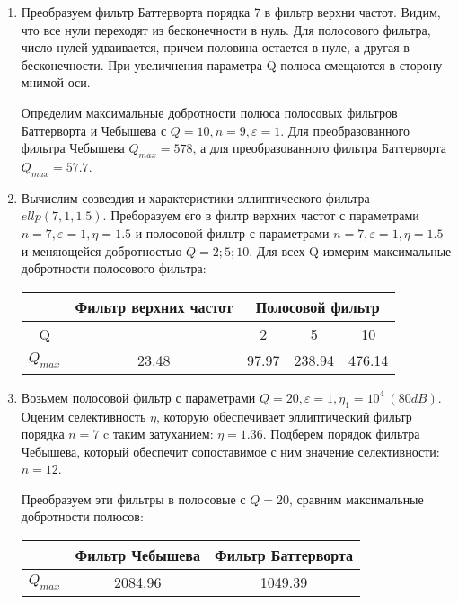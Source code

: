 \documentclass[a4paper, 12pt]{article}%
\begin{document}
\begin{enumerate}
\item Преобразуем фильтр Баттерворта порядка 7 в фильтр верхни частот. Видим, что все нули переходят из бесконечности в нуль. Для полосового фильтра, число нулей удваивается, причем половина остается в нуле, а другая в бесконечности. При увеличнения параметра Q полюса смещаются в сторону мнимой оси.

Определим максимальные добротности полюса полосовых фильтров Баттерворта и Чебышева с $Q = 10, n = 9, \varepsilon = 1$. Для преобразованного фильтра Чебышева $Q_{max} = 578$, а для преобразованного фильтра Баттерворта $Q_{max} = 57.7$.

\item Вычислим созвездия и характеристики эллиптического фильтра $ellp(7, 1, 1.5)$. Преборазуем его в филтр верхних частот с параметрами $n = 7, \varepsilon = 1, \eta = 1.5$ и полосовой фильтр с параметрами $n = 7, \varepsilon = 1, \eta = 1.5$ и меняющейся добротностью $Q = 2;5;10$. Для всех Q измерим максимальные добротности полосового фильтра:

\begin{center}
\begin{tabular}{|c|c|c|c|c|}
\hline 
 & Фильтр верхних частот & \multicolumn{3}{c|}{Полосовой фильтр} \\ 
\hline 
Q &  & 2 & 5 & 10 \\ 
\hline 
$Q_{max}$ & 23.48 & 97.97 & 238.94 & 476.14 \\ 
\hline 
\end{tabular} 
\end{center}

\item Возьмем полосовой фильтр с параметрами $Q = 20, \varepsilon = 1, \eta_1 = 10^4 \: (80dB)$. Оценим селективность $\eta$, которую обеспечивает эллиптический фильтр порядка $n = 7$ c таким затуханием: $\eta = 1.36$. Подберем порядок фильтра Чебышева, который обеспечит сопоставимое с ним значение селективности: $n = 12$.

Преобразуем эти фильтры в полосовые с $Q = 20$, сравним максимальные добротности полюсов:

\begin{center}
\begin{tabular}{|c|c|c|}
\hline 
 & Фильтр Чебышева & Фильтр Баттерворта \\ 
\hline 
$Q_{max}$ & 2084.96 & 1049.39 \\ 
\hline 
\end{tabular} 
\end{center}

\end{enumerate}
\end{document}
